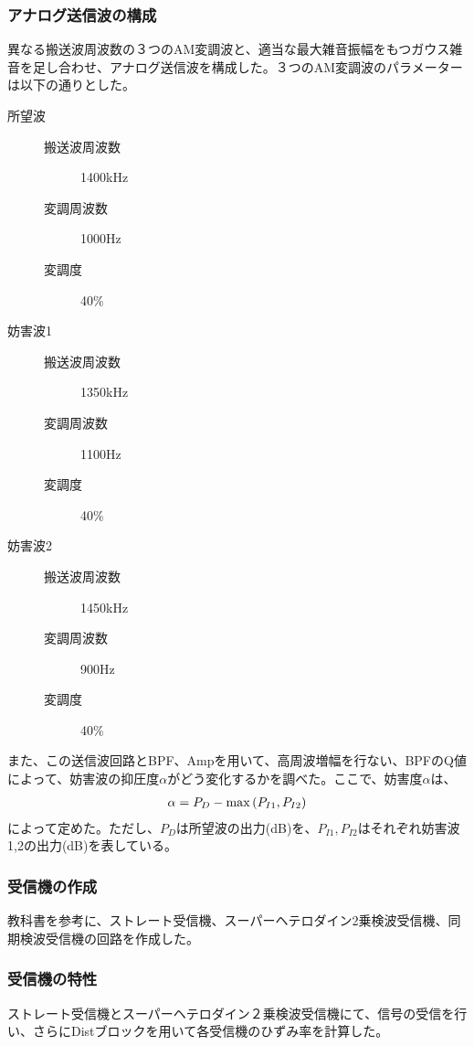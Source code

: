 \documentclass[11pt]{ltjsarticle}
\begin{document}
		\subsubsection{アナログ送信波の構成}
			異なる搬送波周波数の３つのAM変調波と、適当な最大雑音振幅をもつガウス雑音を足し合わせ、アナログ送信波を構成した。３つのAM変調波のパラメーターは以下の通りとした。
			\begin{description}
				\item[所望波] \mbox{}
					\begin{description}
						\item[搬送波周波数] 1400kHz
						\item[変調周波数] 1000Hz
						\item[変調度] 40\%
					\end{description}
				\item[妨害波1] \mbox{}
					\begin{description}
						\item[搬送波周波数] 1350kHz
						\item[変調周波数] 1100Hz
						\item[変調度] 40\%
					\end{description}
				\item[妨害波2] \mbox{}
					\begin{description}
						\item[搬送波周波数] 1450kHz
						\item[変調周波数] 900Hz
						\item[変調度] 40\%
					\end{description}
			\end{description}
			
			また、この送信波回路とBPF、Ampを用いて、高周波増幅を行ない、BPFのQ値によって、妨害波の抑圧度$\alpha$がどう変化するかを調べた。ここで、妨害度$\alpha$は、
			\begin{eqnarray}
				\alpha = P_{D} - {\rm max}\left( P_{I1},P_{I2} \right) \label{eq1}
			\end{eqnarray}
			によって定めた。ただし、$P_{D}$は所望波の出力(dB)を、$P_{I1},P_{I2}$はそれぞれ妨害波1,2の出力(dB)を表している。

		\subsubsection{受信機の作成}
			教科書を参考に、ストレート受信機、スーパーヘテロダイン2乗検波受信機、同期検波受信機の回路を作成した。
		\subsubsection{受信機の特性}
			ストレート受信機とスーパーヘテロダイン２乗検波受信機にて、信号の受信を行い、さらにDistブロックを用いて各受信機のひずみ率を計算した。
			
\end{document}
